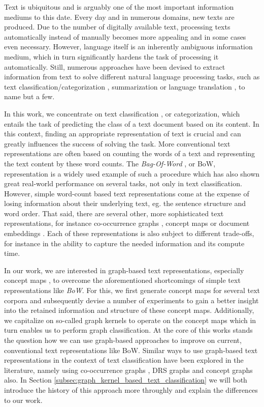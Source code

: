 Text is ubiquitous and is arguably one of the most important information mediums  to this date.
Every day and in numerous domains, new texts are produced.
Due to the number of digitally available text, processing texts automatically instead of manually becomes more appealing and in some cases even necessary.
However, language itself is an inherently ambiguous information medium, which in turn significantly hardens the task of processing it automatically.
Still, numerous approaches have been devised to extract information from text to solve different natural language processing tasks, such as text classification/categorization \cite[p.~575]{Manning2000}, summarization \cite{Mani1999} or language translation \cite{Weaver1955}, to name but a few.

In this work, we concentrate on text classification \cite[p.~232]{Manning2000}, or categorization, which entails the task of predicting the class of a text document based on its content.
In this context, finding an appropriate representation of text is crucial and can greatly influences the success of solving the task.
More conventional text representations are often based on counting the words of a text and representing the text content by these word counts.
The \textit{Bag-Of-Word} \cite[p.~237]{Manning2000}, or BoW, representation is a widely used example of such a procedure which has also shown great real-world performance on several tasks, not only in text classification.
However, simple word-count based text representations come at the expense of losing information about their underlying text, eg. the sentence structure and word order.
That said, there are several other, more sophisticated text representations, for instance co-occurrence graphs \cite{Rousseau2013}, concept maps \cite{Novak2008,Falke2017b} or document embeddings \cite{Dai2015,Lau2016}.
Each of these representations is also subject to different trade-offs, for instance in the ability to capture the needed information and its compute time.

In our work, we are interested in graph-based text representations, especially concept maps \cite{Novak2008,Falke2017b}, to overcome the aforementioned shortcomings of simple text representations like \textit{BoW}.
For this, we first generate concept maps for several text corpora and subsequently devise a number of experiments to gain a better insight into the retained information and structure of these concept maps.
Additionally, we capitalize on so-called graph kernels \cite{Kulharia2008} to operate on the concept maps which in turn enables us to perform graph classification.
At the core of this works stands the question how we can use graph-based approaches to improve on current, conventional text representations like BoW.
Similar ways to use graph-based text representations in the context of text classification have been explored in the literature, namely using co-occurrence graphs \cite{Rousseau2015a, Nikolentzos2017a}, DRS graphs \cite{Gaspar2011} and concept graphs \cite{Gulrandhe2015} also.
In Section \ref{subsec:graph_kernel_based_text_classification} we will both introduce the history of this approach more throughly and explain the differences to our work.

